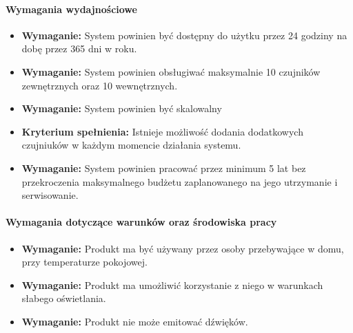 \documentclass{article}
\begin{document}
\paragraph{Wymagania wydajnościowe}
\begin{itemize}
\item \textbf{Wymaganie:} System powinien być dostępny do użytku przez 24 godziny na dobę przez 365 dni w roku.\\
\end{itemize}
\begin{itemize}
\item \textbf{Wymaganie:} System powinien obsługiwać maksymalnie 10 czujników zewnętrznych oraz 10 wewnętrznych.\\
\end{itemize}
\begin{itemize}
\item \textbf{Wymaganie:} System powinien być skalowalny
\item \textbf{Kryterium spełnienia:} Istnieje możliwość dodania dodatkowych czujniuków w każdym momencie działania systemu.\\ 
\end{itemize}
\begin{itemize}
\item \textbf{Wymaganie:} System powinien pracować przez minimum 5 lat bez przekroczenia maksymalnego budżetu zaplanowanego na jego utrzymanie i serwisowanie.\\
\end{itemize}

\paragraph{Wymagania dotyczące warunków oraz środowiska pracy}
\begin{itemize}
\item \textbf{Wymaganie:} Produkt ma być używany przez osoby przebywające w domu, przy temperaturze pokojowej.\\
\end{itemize}
\begin{itemize}
\item \textbf{Wymaganie:} Produkt ma umożliwić korzystanie z niego w warunkach słabego oświetlania.\\
\end{itemize}
\begin{itemize}
\item \textbf{Wymaganie:} Produkt nie może emitować dźwięków.
\end{itemize}
\end{document}
